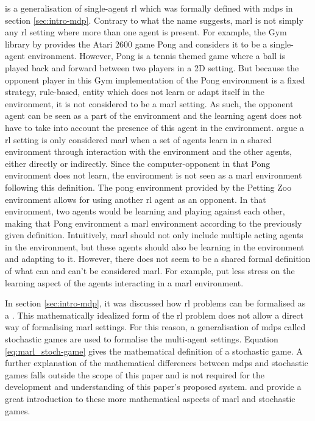  is a generalisation of single-agent \gls{rl} which was formally defined with \glspl{mdp} in section \ref{sec:intro-mdp}.
Contrary to what the name suggests, \gls{marl} is not simply any \gls{rl} setting where more than one agent is present.
For example, the Gym library by \citet{gym} provides the Atari 2600 game Pong and considers it to be a single-agent environment.
However, Pong is a tennis themed game where a ball is played back and forward between two players in a 2D setting.
But because the opponent player in this Gym implementation of the Pong environment is a fixed strategy, rule-based, entity which does not learn or adapt itself in the environment, it is not considered to be a \gls{marl} setting.
As such, the opponent agent can be seen as a part of the environment and the learning agent does not have to take into account the presence of this agent in the environment.
 argue a \gls{rl} setting is only considered \gls{marl} when a set of agents learn in a shared environment through interaction with the environment and the other agents, either directly or indirectly.
Since the computer-opponent in that Pong environment does not learn, the environment is not seen as a \gls{marl} environment following this definition.
The pong environment provided by the Petting Zoo environment \citep{pettingzoo} allows for using another \gls{rl} agent as an opponent.
In that environment, two agents would be learning and playing against each other, making that Pong environment a \gls{marl} environment according to the previously given definition.
Intuitively, \gls{marl} should not only include multiple acting agents in the environment, but these agents should also be learning in the environment and adapting to it.
However, there does not seem to be a shared formal definition of what can and can't be considered \gls{marl}.
For example, \citet{marl_intro} put less stress on the learning aspect of the agents interacting in a \gls{marl} environment.

In section \ref{sec:intro-mdp}, it was discussed how \gls{rl} problems can be formalised as a .
This mathematically idealized form of the \gls{rl} problem does not allow a direct way of formalising \gls{marl} settings.
For this reason, a generalisation of \glspl{mdp} called stochastic games are used to formalise the multi-agent settings.
Equation \ref{eq:marl_stoch-game} gives the mathematical definition of a stochastic game.
A further explanation of the mathematical differences between \glspl{mdp} and stochastic games falls outside the scope of this paper and is not required for the development and understanding of this paper's proposed system.
 and \citet{marl_intro} provide a great introduction to these more mathematical aspects of \gls{marl} and stochastic games.


